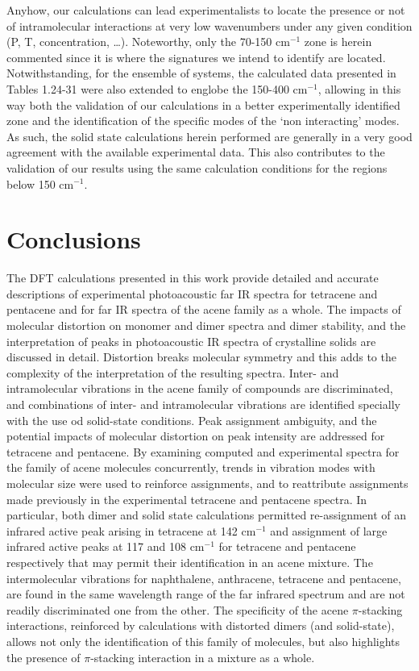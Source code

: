  	Anyhow, our calculations can lead experimentalists to locate the presence or not of intramolecular interactions at very low wavenumbers under any given condition (P, T, concentration, …). Noteworthy, only the 70-150 cm$^{-1}$ zone is herein commented since it is where the signatures we intend to identify are located. Notwithstanding, for the ensemble of systems, the calculated data presented in Tables 1.24-31 were also extended to englobe the 150-400 cm$^{-1}$, allowing in this way both the validation of our calculations in a better experimentally identified zone and the identification of the specific modes of the ‘non interacting’ modes. As such, the solid state calculations herein performed are generally in a very good agreement with the available experimental data. This also contributes to the validation of our results using the same calculation conditions for the regions below 150 cm$^{-1}$. 
 	
 		
 	
 
 \section*{Conclusions}
 
 The DFT calculations presented in this work provide detailed and accurate descriptions of experimental photoacoustic far IR spectra for tetracene and pentacene and for far IR spectra of the acene family as a whole.  The impacts of molecular distortion on monomer and dimer spectra and dimer stability, and the interpretation of peaks in photoacoustic IR spectra of crystalline solids are discussed in detail. Distortion breaks molecular symmetry and this adds to the complexity of the interpretation of the resulting spectra. Inter- and intramolecular vibrations in the acene family of compounds are discriminated, and combinations of inter- and intramolecular vibrations are identified specially with the use od solid-state conditions. Peak assignment ambiguity, and the potential impacts of molecular distortion on peak intensity are addressed for tetracene and pentacene. By examining computed and experimental spectra for the family of acene molecules concurrently, trends in vibration modes with molecular size were used to reinforce assignments, and to reattribute assignments made previously in the experimental tetracene and pentacene spectra. In particular, both dimer and solid state calculations permitted re-assignment of an infrared active peak arising in tetracene at 142 cm$^{-1}$ and assignment of large infrared active peaks at 117 and 108 cm$^{-1}$ for tetracene and pentacene respectively that may permit their identification in an acene mixture. The intermolecular vibrations for naphthalene, anthracene, tetracene and pentacene, are found in the same wavelength range of the far infrared spectrum and are not readily discriminated one from the other. The specificity of the acene $\pi$-stacking interactions, reinforced by calculations with distorted dimers (and solid-state), allows not only the identification of this family of molecules, but also highlights the presence of $\pi$-stacking interaction in a mixture as a whole.\\
 

